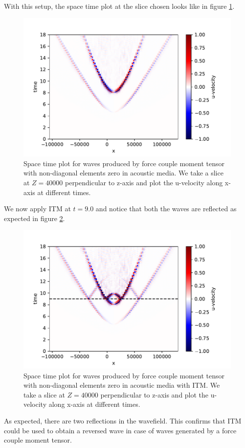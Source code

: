 With this setup, the space time plot at the slice chosen looks like in figure \ref{fig:space-timeplot-doublecouplediagnoITM}.

\begin{figure}
    \centering
    \includegraphics[width=0.75\linewidth]{figures/double-couple-diag-noITM.pdf}
    \caption{Space time plot for waves produced by force couple moment tensor with non-diagonal elements zero in acoustic media. We take a slice at $Z=40000$ perpendicular to z-axis and plot the u-velocity along x-axis at different times.}
    \label{fig:space-timeplot-doublecouplediagnoITM}
\end{figure}
We now apply \ac{ITM} at $t=9.0$ and notice that both the waves are reflected as expected in figure \ref{fig:space-timeplot-doublecouplediagITM}.

\begin{figure}
    \centering
    \includegraphics[width=0.75\linewidth]{figures/double-couple-diag.pdf}
    \caption{Space time plot for waves produced by force couple moment tensor with non-diagonal elements zero in acoustic media with \ac{ITM}. We take a slice at $Z=40000$ perpendicular to z-axis and plot the u-velocity along x-axis at different times.}
    \label{fig:space-timeplot-doublecouplediagITM}
\end{figure}
As expected, there are two reflections in the wavefield. This confirms that \ac{ITM} could be used to obtain a reversed wave in case of waves generated by a force couple moment tensor.

